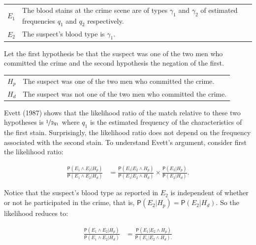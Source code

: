 \documentclass[10pt,dvipsnames,enabledeprecatedfontcommands]{scrartcl}
\newcommand{\pr}[1]{\mathsf{P}(#1)}
\begin{document}
\begin{center}
    \begin{tabular}{lp{10cm}} 
        $E_1$ & The blood stains at the crime scene are of types $\gamma_1$ and $\gamma_2$ of estimated  frequencies $q_1$ and $q_2$ respectively.\\
        $E_2$ & The suspect's blood type is $\gamma_1$. 
    \end{tabular}
 \end{center}

\vspace{2mm}

\noindent  Let the first hypothesis be that the suspect was one of the
two men who committed the crime and the second hypothesis the negation
of the first. \vspace{2mm}

\begin{center}
    \begin{tabular}{lp{12cm}} 
        $H_p$ & The suspect was one of the two men who committed the crime.\\
        $H_d$ & The suspect was not one of the two men who committed the crime.
    \end{tabular}
 \end{center}

\vspace{2mm} Evett (1987) shows that the likelihood ratio of the match
relative to these two hypotheses is \(\nicefrac{1}{2q_1}\) where \(q_1\)
is the estimated frequency of the characteristics of the first stain.
Surprisingly, the likelihood ratio does not depend on the frequency
associated with the second stain. To understand Evett's argument,
consider first the likelihood ratio:

\begin{align*}
\frac{\pr{E_1\wedge E_2\vert H_p}}{
    \pr{E_1\wedge E_2\vert H_d}} & = \frac{\pr{E_1 \vert E_2 \wedge H_p}}{
    \pr{E_1 \vert E_2 \wedge H_d}
    }\times 
 \frac{\pr{E_2\vert H_p}}{\pr{E_2 \vert H_d}}. 
 \end{align*}

\noindent Notice that the suspect's blood type as reported in \(E_2\) is
independent of whether or not he participated in the crime, that is,
\(\pr{E_2\vert H_p}=\pr{E_2 \vert H_d}\). So the likelihood reduces to:

\begin{align*}
 \frac{\pr{E_1\wedge E_2\vert H_p}}{
    \pr{E_1\wedge E_2\vert H_d}} & = \frac{\pr{E_1 \vert E_2 \wedge H_p}}{
    \pr{E_1 \vert E_2 \wedge H_d}.
 } 
 \end{align*}
\end{document}
